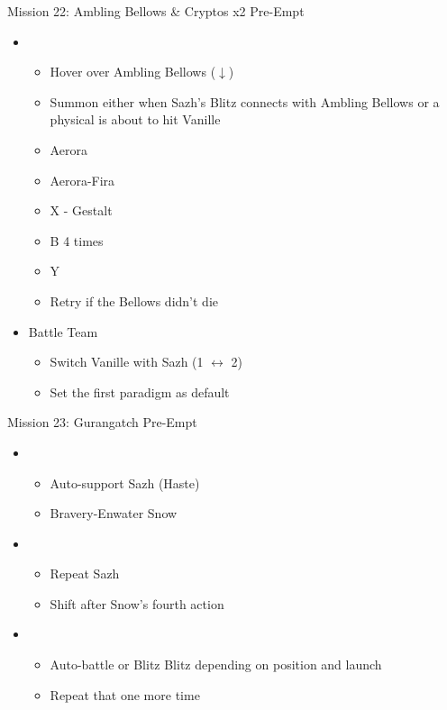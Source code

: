 \begin{multicols}{2}
\begin{battle}{Mission 22: Ambling Bellows \& Cryptos x2 Pre-Empt}
\begin{itemize}
    \item \sixth
    \begin{itemize}
        \item Hover over Ambling Bellows ($\downarrow$)
        \item Summon either when Sazh's Blitz connects with Ambling Bellows or a physical is about to hit Vanille
        \item Aerora
        \item Aerora-Fira
        \item X - Gestalt
        \item B 4 times
        \item Y
        \item Retry if the Bellows didn't die
    \end{itemize}
\end{itemize}
\end{battle}
\vfill
\begin{menu}
\begin{itemize}
    \paradigm
    \begin{itemize}
        \item Battle Team
        \begin{itemize}
            \item Switch Vanille with Sazh (1 $\leftrightarrow$ 2)
            \item Set the first paradigm as default
        \end{itemize}
    \end{itemize}
\end{itemize}
\end{menu}
\begin{battle}{Mission 23: Gurangatch Pre-Empt}
\begin{itemize}
    \item \first
    \begin{itemize}
        \item Auto-support Sazh (Haste)
        \item Bravery-Enwater Snow
    \end{itemize}
    \item \fifth
    \begin{itemize}
        \item Repeat Sazh
        \item Shift after Snow's fourth action
    \end{itemize}
    \item \sixth
    \begin{itemize}
        \item Auto-battle or Blitz Blitz depending on position and launch
        \item Repeat that one more time
    \end{itemize}
\end{itemize}
\end{battle}


\end{multicols}
